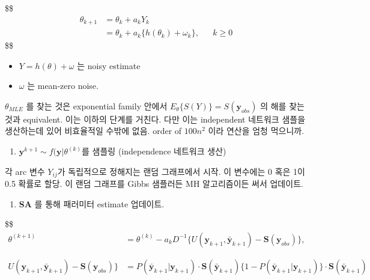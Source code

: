 \documentclass[
]{book}
\providecommand{\tightlist}{%
  \setlength{\itemsep}{0pt}\setlength{\parskip}{0pt}}
\begin{document}
{{{\$\$
\begin{align}
\theta_{k+1} 
&= \theta_k + a_k Y_k 

\\

&=\theta_k + a_k \Big \{ h(\theta_k) + \omega_k \Big \}, && k \ge 0 
\end{align}
\$\$

\begin{itemize}
\tightlist
\item
  \(Y = h(\theta) + \omega\) 는 noisy estimate
\item
  \(\omega\) 는 mean-zero noise.
\end{itemize}

\(\theta_{MLE}\) 를 찾는 것은 exponential family 안에서 \(E_\theta \{ S(Y) \} = S(\mathbf y_{obs})\) 의 해를 찾는 것과 equivalent. 이는 이하의 단계를 거친다. 다만 이는 independent 네트워크 샘플을 생산하는데 있어 비효율적일 수밖에 없음. order of \(100n^2\) 이라 연산을 엄청 먹으니까.

\begin{enumerate}
\def\labelenumi{\arabic{enumi}.}
\tightlist
\item
  \(\mathbf y^{k+1} \sim f(\mathbf y | \theta^{(k)}\)를 샘플링 (independence 네트워크 생산)
\end{enumerate}

각 arc 변수 \(Y_{ij}\)가 독립적으로 정해지는 랜덤 그래프에서 시작. 이 변수에는 0 혹은 1이 0.5 확률로 할당. 이 랜덤 그래프를 Gibbs 샘플러든 MH 알고리즘이든 써서 업데이트.

\begin{enumerate}
\def\labelenumi{\arabic{enumi}.}
\setcounter{enumi}{1}
\tightlist
\item
  \textbf{SA} 를 통해 패러미터 estimate 업데이트.
\end{enumerate}

\$\$
\begin{align}
\theta^{(k+1)} &= \theta^{(k)} - a_k D^{-1} \Big \{ U( \mathbf y_{k+1}, \bar {\mathbf y}_{k+1} ) - \mathbf S (\mathbf y_{obs} ) \Big \},
\\
\\
\\
U( \mathbf y_{k+1}, \bar {\mathbf y}_{k+1} ) - \mathbf S (\mathbf y_{obs} ) \Big 
\} &= P(\bar {\mathbf y}_{k+1} \Big | \mathbf y_{k+1} ) \cdot \mathbf S (\mathbf {\bar y}_{k+1} ) 

\Big \{ 1-P(\mathbf {\bar y}_{k+1} \Big | \mathbf y_{k+1} ) \Big \} \cdot \mathbf S (\mathbf {\bar y}_{k+1} ) 


\end{align}}}}
\end{document}
